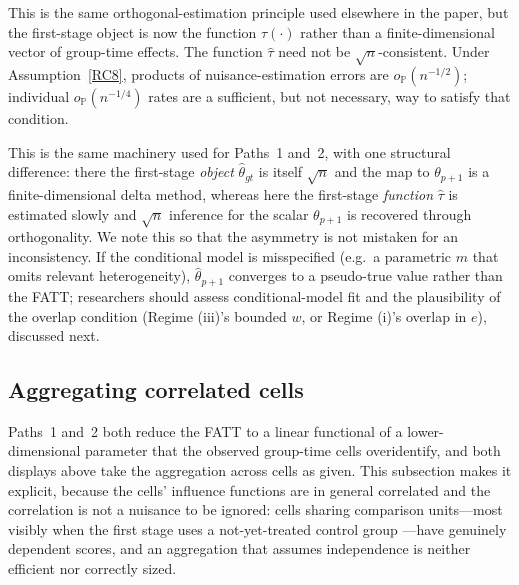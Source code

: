 \documentclass{article}
\renewcommand{\P}{\mathbb{P}}
\begin{document}
This is the same orthogonal-estimation principle used elsewhere in the paper, but the first-stage object is now the function $\tau(\cdot)$ rather than a finite-dimensional vector of group-time effects. The function $\widehat{\tau}$ need not be $\sqrt n$-consistent. Under Assumption~\ref{RC8}, products of nuisance-estimation errors are $o_{\P}(n^{-1/2})$; individual $o_{\P}(n^{-1/4})$ rates are a sufficient, but not necessary, way to satisfy that condition.

This is the same machinery used for Paths~1 and~2, with one structural difference: there the first-stage \emph{object} $\widehat{\theta}_{gt}$ is itself $\sqrt{n}$ and the map to $\theta_{p+1}$ is a finite-dimensional delta method, whereas here the first-stage \emph{function} $\widehat{\tau}$ is estimated slowly and $\sqrt{n}$ inference for the scalar $\theta_{p+1}$ is recovered through orthogonality. We note this so that the asymmetry is not mistaken for an inconsistency. If the conditional model is misspecified (e.g.\ a parametric $m$ that omits relevant heterogeneity), $\widehat{\theta}_{p+1}$ converges to a pseudo-true value rather than the FATT; researchers should assess conditional-model fit and the plausibility of the overlap condition (Regime (iii)'s bounded $w$, or Regime (i)'s overlap in $e$), discussed next.

\subsection{Aggregating correlated cells}\label{sec:md-aggregation}

Paths~1 and~2 both reduce the FATT to a linear functional of a lower-dimensional parameter that the observed group-time cells overidentify, and both displays above take the aggregation across cells as given. This subsection makes it explicit, because the cells' influence functions are in general correlated and the correlation is not a nuisance to be ignored: cells sharing comparison units---most visibly when the first stage uses a not-yet-treated control group \citep{callawayDifferenceindifferencesMultipleTime2021}---have genuinely dependent scores, and an aggregation that assumes independence is neither efficient nor correctly sized.
\end{document}
